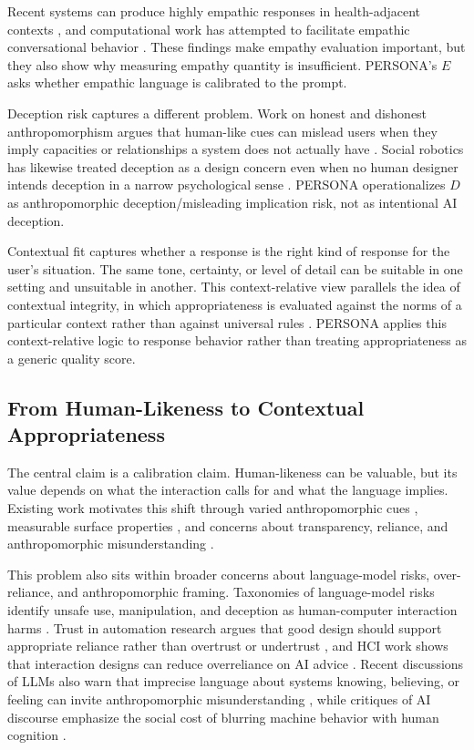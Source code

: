 \documentclass[manuscript,review,anonymous]{acmart}
\begin{document}
Recent systems can produce highly empathic responses in health-adjacent contexts \cite{ayers2023}, and computational work has attempted to facilitate empathic conversational behavior \cite{sharma2021}. These findings make empathy evaluation important, but they also show why measuring empathy quantity is insufficient. PERSONA's $E$ asks whether empathic language is calibrated to the prompt.

Deception risk captures a different problem. Work on honest and dishonest anthropomorphism argues that human-like cues can mislead users when they imply capacities or relationships a system does not actually have \cite{kaminski2017,leong2019}. Social robotics has likewise treated deception as a design concern even when no human designer intends deception in a narrow psychological sense \cite{sharkey2021}. PERSONA operationalizes $D$ as anthropomorphic deception/misleading implication risk, not as intentional AI deception.

Contextual fit captures whether a response is the right kind of response for the user's situation. The same tone, certainty, or level of detail can be suitable in one setting and unsuitable in another. This context-relative view parallels the idea of contextual integrity, in which appropriateness is evaluated against the norms of a particular context rather than against universal rules \cite{nissenbaum2004}. PERSONA applies this context-relative logic to response behavior rather than treating appropriateness as a generic quality score.

\subsection{From Human-Likeness to Contextual Appropriateness}

The central claim is a calibration claim. Human-likeness can be valuable, but its value depends on what the interaction calls for and what the language implies. Existing work motivates this shift through varied anthropomorphic cues \cite{devrio2025}, measurable surface properties \cite{cheng2025}, and concerns about transparency, reliance, and anthropomorphic misunderstanding \cite{abercrombie2023,leong2019,sharkey2021}.

This problem also sits within broader concerns about language-model risks, over-reliance, and anthropomorphic framing. Taxonomies of language-model risks identify unsafe use, manipulation, and deception as human-computer interaction harms \cite{Weidinger2022Risks}. Trust in automation research argues that good design should support appropriate reliance rather than overtrust or undertrust \cite{lee2004}, and HCI work shows that interaction designs can reduce overreliance on AI advice \cite{Bucinca2021CognitiveForcing}. Recent discussions of LLMs also warn that imprecise language about systems knowing, believing, or feeling can invite anthropomorphic misunderstanding \cite{Shanahan2024Talking}, while critiques of AI discourse emphasize the social cost of blurring machine behavior with human cognition \cite{bender2024}.
\end{document}
